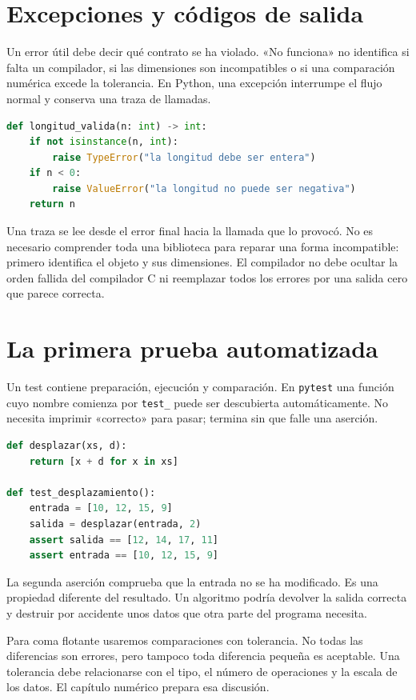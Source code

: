 \documentclass[12pt,a4paper,oneside]{report}
\begin{document}
\section{Excepciones y códigos de salida}
Un error útil debe decir qué contrato se ha violado. «No funciona» no identifica si falta un compilador, si las dimensiones son incompatibles o si una comparación numérica excede la tolerancia. En Python, una excepción interrumpe el flujo normal y conserva una traza de llamadas.

\begin{lstlisting}[language=Python]
def longitud_valida(n: int) -> int:
    if not isinstance(n, int):
        raise TypeError("la longitud debe ser entera")
    if n < 0:
        raise ValueError("la longitud no puede ser negativa")
    return n
\end{lstlisting}
Una traza se lee desde el error final hacia la llamada que lo provocó. No es necesario comprender toda una biblioteca para reparar una forma incompatible: primero identifica el objeto y sus dimensiones. El compilador no debe ocultar la orden fallida del compilador C ni reemplazar todos los errores por una salida cero que parece correcta.

\section{La primera prueba automatizada}
Un test contiene preparación, ejecución y comparación. En \texttt{pytest} una función cuyo nombre comienza por \texttt{test\_} puede ser descubierta automáticamente. No necesita imprimir «correcto» para pasar; termina sin que falle una aserción.

\begin{lstlisting}[language=Python]
def desplazar(xs, d):
    return [x + d for x in xs]

def test_desplazamiento():
    entrada = [10, 12, 15, 9]
    salida = desplazar(entrada, 2)
    assert salida == [12, 14, 17, 11]
    assert entrada == [10, 12, 15, 9]
\end{lstlisting}
La segunda aserción comprueba que la entrada no se ha modificado. Es una propiedad diferente del resultado. Un algoritmo podría devolver la salida correcta y destruir por accidente unos datos que otra parte del programa necesita.

Para coma flotante usaremos comparaciones con tolerancia. No todas las diferencias son errores, pero tampoco toda diferencia pequeña es aceptable. Una tolerancia debe relacionarse con el tipo, el número de operaciones y la escala de los datos. El capítulo numérico prepara esa discusión.
\end{document}
